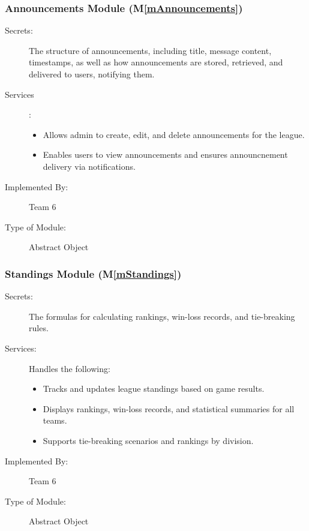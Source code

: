 \documentclass[12pt, titlepage]{article}
\newcommand{\mref}[1]{M\ref{#1}}
\begin{document}
\subsubsection{Announcements Module (\mref{mAnnouncements})}

\begin{description}
  \item[Secrets:] The structure of announcements, including title, message content, timestamps, as well as how announcements are stored, retrieved, and delivered to users, notifying them.

  \item[Services]:
        \begin{itemize}
          \item Allows admin to create, edit, and delete announcements for the league.
          \item Enables users to view announcements and ensures announcnement delivery via notifications.
        \end{itemize}

  \item[Implemented By:] Team 6

  \item[Type of Module:] Abstract Object
\end{description}

\subsubsection{Standings Module (\mref{mStandings})}

\begin{description}
  \item[Secrets:] The formulas for calculating rankings, win-loss records, and tie-breaking rules.

  \item[Services:] Handles the following:
        \begin{itemize}
          \item Tracks and updates league standings based on game results.
          \item Displays rankings, win-loss records, and statistical summaries for all teams.
          \item Supports tie-breaking scenarios and rankings by division.
        \end{itemize}

  \item[Implemented By:] Team 6

  \item[Type of Module:] Abstract Object
\end{description}
\end{document}
